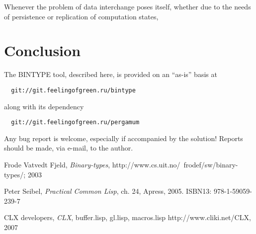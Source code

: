 \documentclass[%
	final,
	titlepage,
	anonymous,
	]{ieee}
\begin{document}
\PARstartCal Whenever the problem of data interchange poses itself,
whether due to the needs of persistence or replication of computation states,


\section{Conclusion}

The BINTYPE tool, described here, is provided on an ``as-is'' basis at

\begin{verbatim}
  git://git.feelingofgreen.ru/bintype
\end{verbatim}

\noindent along with its dependency

\begin{verbatim}
  git://git.feelingofgreen.ru/pergamum
\end{verbatim}

\noindent Any bug report is welcome, especially if accompanied by the solution!
Reports should be made, via e-mail, to the author.

%
%
%
%
%

\begin{thebibliography}{1}

Frode Vatvedt Fjeld, {\em Binary-types},
\newblock http://www.cs.uit.no/~frodef/sw/binary-types/; 2003

Peter Seibel, {\em Practical Common Lisp}, ch. 24,
\newblock Apress, 2005. ISBN13: 978-1-59059-239-7

CLX developers, {\em CLX}, buffer.lisp, gl.lisp, macros.lisp
\newblock http://www.cliki.net/CLX, 2007

\end{thebibliography}
\end{document}
